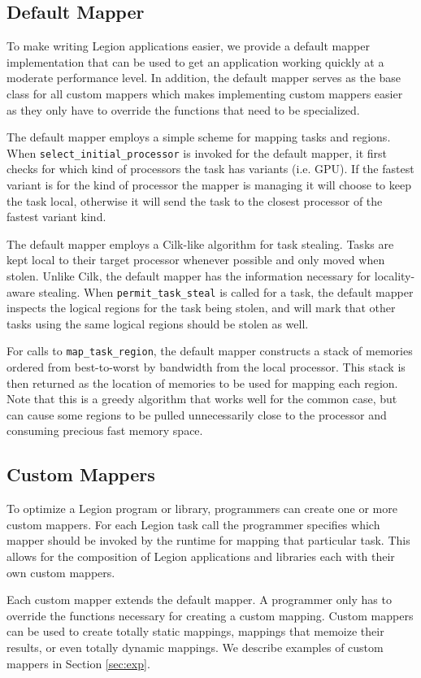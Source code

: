 \subsection{Default Mapper}
\label{sec:defmapper}
To make writing Legion applications easier, we provide a default mapper implementation that
can be used to get an application working quickly at a moderate performance level.  In addition,
the default mapper serves as the base class for all custom mappers which makes implementing
custom mappers easier as they only have to override the functions that need to be specialized.

The default mapper employs a simple scheme for mapping tasks and regions.  When
{\tt select\_initial\_processor} is invoked for the default mapper, it first checks for which kind of processors
the task has variants (i.e. GPU).  If the fastest variant is for the kind of processor the mapper is managing
it will choose to keep the task local, otherwise it will send the task to the closest processor of the
fastest variant kind.

The default mapper employs a Cilk-like algorithm for task stealing\cite{CILK95}.  Tasks are kept local
to their target processor whenever possible and only moved when stolen.  Unlike Cilk, the default mapper
has the information necessary for locality-aware stealing.  When {\tt permit\_task\_steal} is called for a task, 
the default mapper inspects the logical regions for the task being stolen, and will mark that other tasks using 
the same logical regions should be stolen as well.

For calls to {\tt map\_task\_region}, the default mapper constructs a stack of memories ordered from best-to-worst
by bandwidth from the local processor.  This stack is then returned as the location of memories to be used for
mapping each region.  Note that this is a greedy algorithm that works well for the common case, but can cause some 
regions to be pulled unnecessarily close to the processor and consuming precious fast memory space.  

\subsection{Custom Mappers}
\label{sec:custommap}
To optimize a Legion program or library, programmers can create one or more custom mappers.  
For each Legion task call the programmer specifies which mapper should be invoked by the runtime for
mapping that particular task.  This allows for the composition of Legion applications and libraries
each with their own custom mappers.

Each custom mapper extends the default mapper.  A programmer only has to override the functions necessary 
for creating a custom mapping.  Custom mappers can be used to create totally static mappings, 
mappings that memoize their results, or even totally dynamic mappings.  We describe examples of 
custom mappers in Section \ref{sec:exp}.




